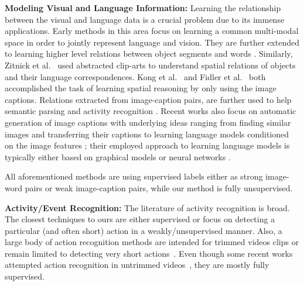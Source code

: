 \noindent\textbf{Modeling Visual and Language Information:}
Learning the relationship between the visual and language data is a crucial problem due to its immense applications. Early methods \cite{matching} in this area focus on learning a common multi-modal space in order to jointly represent language and vision. They are further extended to learning higher level relations between object segments and words \cite{connecting}. Similarly, 
Zitnick et al.~\cite{zitnick2013learning,zitnick2013bringing} used abstracted clip-arts to understand spatial relations of objects and their language correspondences. Kong et al.~\cite{kong2014you} and 
Fidler et al.~\cite{fidler2013sentence} both accomplished the task of learning spatial reasoning by only using the image captions. Relations extracted from image-caption pairs, are further used to help semantic parsing \cite{yu2013grounded} and activity recognition \cite{motwani2012improving}. Recent works also focus on automatic generation of image captions with underlying ideas ranging from finding similar images and transferring their captions \cite{ordonez2011im2text} to learning language models conditioned on the image features \cite{kiros2014multimodal,socher2014grounded,farhadi2010every}; their employed approach to learning language models is typically either based on graphical models \cite{farhadi2010every} or neural networks \cite{socher2014grounded,kiros2014multimodal,deepAlignment}.

All aforementioned methods are using supervised labels either as strong image-word pairs or weak image-caption pairs, while our method is fully unsupervised.

\noindent\textbf{Activity/Event Recognition:}
The literature of activity recognition is broad. The closest techniques to ours are either supervised or focus on detecting a particular (and often short) action in a weakly/unsupervised manner. Also, a large body of action recognition methods are intended for trimmed videos clips or remain limited to detecting very short actions~\cite{kuehne2011hmdb, UCF101, niebles10_eccv, laptev08_cvpr, efros03_iccv, ryoo09_iccv}. Even though some recent works attempted action recognition in untrimmed videos~\cite{THUMOS14, oneata2014lear, jainuniversity}, they are mostly fully supervised.


